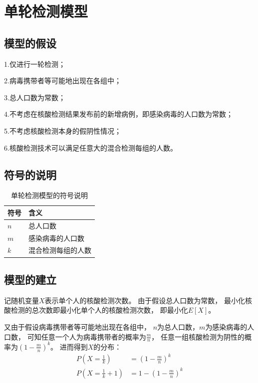 \documentclass[12pt]{article}
\begin{document}
\newpage
{\centering\section{单轮检测模型}}

\subsection{模型的假设}

1.仅进行一轮检测；

2.病毒携带者等可能地出现在各组中；

3.总人口数为常数；

4.不考虑在核酸检测结果发布前的新增病例，即感染病毒的人口数为常数；

5.不考虑核酸检测本身的假阴性情况；

6.核酸检测技术可以满足任意大的混合检测每组的人数。

\subsection{符号的说明}

\begin{table}[h]
\centering
\begin{tabular}{|l|l|} 
\hline
符号 & 含义 \\
\hline
$n$ & 总人口数 \\
$m$ & 感染病毒的人口数 \\
$k$ & 混合检测每组的人数 \\
\hline
\end{tabular}
\caption{单轮检测模型的符号说明}
\end{table}

\subsection{模型的建立}

记随机变量$X$表示单个人的核酸检测次数。
由于假设总人口数为常数，
最小化核酸检测的总次数即最小化单个人的核酸检测次数，
即最小化$E[X]$。

又由于假设病毒携带者等可能地出现在各组中，
$n$为总人口数，$m$为感染病毒的人口数，
可知任意一个人为病毒携带者的概率为$\frac{m}{n}$，
任意一组核酸检测为阴性的概率为$(1 - \frac{m}{n})^k$。
进而得到$X$的分布：
\begin{align*}
P(X = \frac{1}{k}) &= (1 - \frac{m}{n})^k \\
P(X = \frac{1}{k} + 1) &= 1 - (1 - \frac{m}{n})^k
\end{align*}
\end{document}
